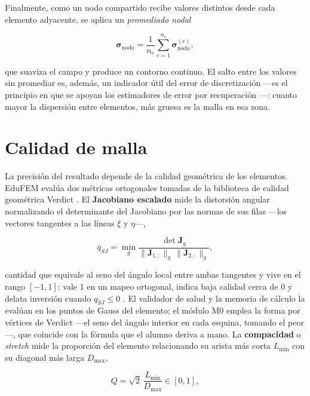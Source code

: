 Finalmente, como un nodo compartido recibe valores distintos desde cada elemento adyacente, se aplica un \emph{promediado nodal}

\begin{equation}
\bm{\sigma}_{\text{nodo}} = \frac{1}{n_e}\sum_{e=1}^{n_e} \bm{\sigma}_{\text{nodo}}^{(e)},
\label{eq:promediado}
\end{equation}

que suaviza el campo y produce un contorno continuo. El salto entre los valores sin promediar es, además, un indicador útil del error de discretización —es el principio en que se apoyan los estimadores de error por recuperación \autocite[pp.~476-477]{zienkiewicz2013fem}—: cuanto mayor la dispersión entre elementos, más gruesa es la malla en esa zona.

\section{Calidad de malla}
\label{sec:calidad-malla}

La precisión del resultado depende de la calidad geométrica de los elementos. EduFEM evalúa dos métricas ortogonales tomadas de la biblioteca de calidad geométrica Verdict \autocite[p.~3]{stimpson2007verdict}. El \textbf{Jacobiano escalado} mide la distorsión angular normalizando el determinante del Jacobiano por las normas de sus filas —los vectores tangentes a las líneas $\xi$ y $\eta$—,

\begin{equation}
q_{SJ} = \min_g \frac{\det\bm{J}_g}{\|\bm{J}_{1,:}\|_g\,\|\bm{J}_{2,:}\|_g},
\label{eq:scaled-jacobian}
\end{equation}

cantidad que equivale al seno del ángulo local entre ambas tangentes y vive en el rango $[-1, 1]$: vale $1$ en un mapeo ortogonal, indica baja calidad cerca de $0$ y delata inversión cuando $q_{SJ} \le 0$ \autocite[p.~51]{stimpson2007verdict}. El validador de salud y la memoria de cálculo la evalúan en los puntos de Gauss del elemento; el módulo M0 emplea la forma por vértices de Verdict —el seno del ángulo interior en cada esquina, tomando el peor—, que coincide con la fórmula que el alumno deriva a mano. La \textbf{compacidad} o \emph{stretch} mide la proporción del elemento relacionando su arista más corta $L_{\min}$ con su diagonal más larga $D_{\max}$,

\begin{equation}
Q = \sqrt{2}\,\frac{L_{\min}}{D_{\max}} \in [0, 1],
\label{eq:stretch}
\end{equation}

